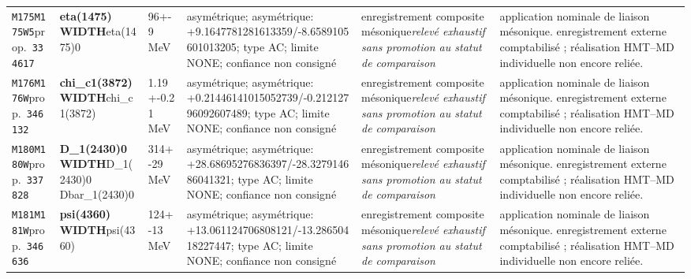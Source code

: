 \begin{landscape}
\begin{longtable}{L{1.85cm}L{4.45cm}L{2.35cm}L{4.05cm}L{3.35cm}L{7.15cm}}
\texttt{M175}\newline \texttt{M175W5}\newline prop.\ \texttt{334617} & \textbf{eta(1475) WIDTH}\newline eta(1475)0 & 96+-9\,MeV & asymétrique; asymétrique: +9.1647781281613359/-8.6589105601013205; type AC; limite NONE; confiance non consigné & enregistrement composite mésonique\newline \emph{relevé exhaustif sans promotion au statut de comparaison} & application nominale de liaison mésonique. enregistrement externe comptabilisé ; réalisation HMT--MD individuelle non encore reliée. \\
\texttt{M176}\newline \texttt{M176W}\newline prop.\ \texttt{346132} & \textbf{chi\_\allowbreak{}c1(3872) WIDTH}\newline chi\_\allowbreak{}c1(3872) & 1.19+-0.21\,MeV & asymétrique; asymétrique: +0.21446141015052739/-0.21212796092607489; type AC; limite NONE; confiance non consigné & enregistrement composite mésonique\newline \emph{relevé exhaustif sans promotion au statut de comparaison} & application nominale de liaison mésonique. enregistrement externe comptabilisé ; réalisation HMT--MD individuelle non encore reliée. \\
\texttt{M180}\newline \texttt{M180W}\newline prop.\ \texttt{337828} & \textbf{D\_\allowbreak{}1(2430)0 WIDTH}\newline D\_\allowbreak{}1(2430)0 \textbar{}\allowbreak{} Dbar\_\allowbreak{}1(2430)0 & 314+-29\,MeV & asymétrique; asymétrique: +28.68695276836397/-28.327914686041321; type AC; limite NONE; confiance non consigné & enregistrement composite mésonique\newline \emph{relevé exhaustif sans promotion au statut de comparaison} & application nominale de liaison mésonique. enregistrement externe comptabilisé ; réalisation HMT--MD individuelle non encore reliée. \\
\texttt{M181}\newline \texttt{M181W}\newline prop.\ \texttt{346636} & \textbf{psi(4360) WIDTH}\newline psi(4360) & 124+-13\,MeV & asymétrique; asymétrique: +13.061124706808121/-13.28650418227447; type AC; limite NONE; confiance non consigné & enregistrement composite mésonique\newline \emph{relevé exhaustif sans promotion au statut de comparaison} & application nominale de liaison mésonique. enregistrement externe comptabilisé ; réalisation HMT--MD individuelle non encore reliée. \\

\end{longtable}
\end{landscape}
